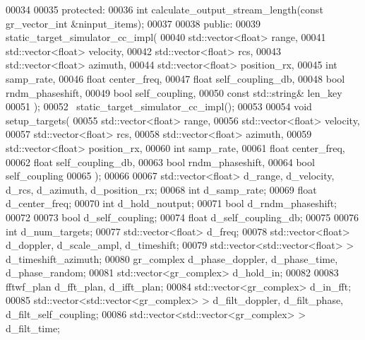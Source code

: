 \begin{DoxyCode}
00034 
00035      \textcolor{keyword}{protected}:
00036       \textcolor{keywordtype}{int} calculate_output_stream_length(\textcolor{keyword}{const} gr\_vector\_int &ninput\_items);
00037 
00038      \textcolor{keyword}{public}:
00039       static_target_simulator_cc_impl(
00040           std::vector<float> range,
00041           std::vector<float> velocity,
00042           std::vector<float> rcs,
00043           std::vector<float> azimuth,
00044           std::vector<float> position\_rx,
00045           \textcolor{keywordtype}{int} samp_rate,
00046           \textcolor{keywordtype}{float} center_freq,
00047           \textcolor{keywordtype}{float} self\_coupling\_db,
00048           \textcolor{keywordtype}{bool} rndm\_phaseshift,
00049           \textcolor{keywordtype}{bool} self\_coupling,
00050           \textcolor{keyword}{const} std::string& len\_key
00051       );
00052       ~static_target_simulator_cc_impl();
00053 
00054       \textcolor{keywordtype}{void} setup_targets(
00055           std::vector<float> range,
00056           std::vector<float> velocity,
00057           std::vector<float> rcs,
00058           std::vector<float> azimuth,
00059           std::vector<float> position\_rx,
00060           \textcolor{keywordtype}{int} samp\_rate,
00061           \textcolor{keywordtype}{float} center\_freq,
00062           \textcolor{keywordtype}{float} self\_coupling\_db,
00063           \textcolor{keywordtype}{bool} rndm\_phaseshift,
00064           \textcolor{keywordtype}{bool} self\_coupling
00065       );
00066 
00067       std::vector<float> d_range, d_velocity, d_rcs, d_azimuth, d_position_rx;
00068       \textcolor{keywordtype}{int} d_samp_rate;
00069       \textcolor{keywordtype}{float} d_center_freq;
00070       \textcolor{keywordtype}{int} d_hold_noutput;
00071       \textcolor{keywordtype}{bool} d_rndm_phaseshift;
00072 
00073       \textcolor{keywordtype}{bool} d_self_coupling;
00074       \textcolor{keywordtype}{float} d_self_coupling_db;
00075 
00076       \textcolor{keywordtype}{int} d_num_targets;
00077       std::vector<float> d_freq;
00078       std::vector<float> d_doppler, d_scale_ampl, d_timeshift;
00079       std::vector<std::vector<float> > d_timeshift_azimuth;
00080       gr\_complex d_phase_doppler, d_phase_time, d_phase_random;
00081       std::vector<gr\_complex> d_hold_in;
00082 
00083       fftwf\_plan d_fft_plan, d_ifft_plan;
00084       std::vector<gr\_complex> d_in_fft;
00085       std::vector<std::vector<gr\_complex> > d_filt_doppler, d_filt_phase, 
      d_filt_self_coupling;
00086       std::vector<std::vector<gr\_complex> > d_filt_time;

\end{DoxyCode}
